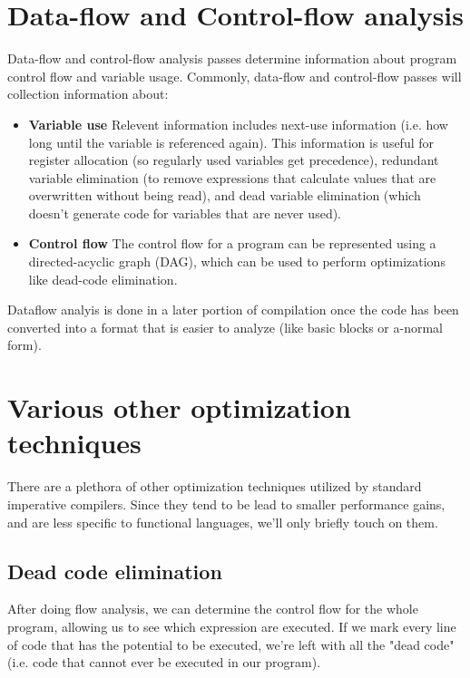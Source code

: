 \documentclass{book}
\newlength{\stabLeft}
\newcommand{\atItemizeStart}[0]{\addtolength{\stabLeft}{\labelsep}
                                \addtolength{\stabLeft}{\labelwidth}}
\let\SOriginalthesubsubsection\thesubsubsection
\newcommand{\Ssubsection}[2]{\subsection[#1]{#2}\let\thesubsubsection\SOriginalthesubsubsection}
\newcommand{\Ssubsubsection}[2]{\subsubsection[#1]{#2}}
\renewcommand{\Ssubsection}[2]{\section[#1]{#2}}
\renewcommand{\Ssubsubsection}[2]{\subsection[#1]{#2}}
\begin{document}
\Ssubsection{Data{-}flow and Control{-}flow analysis}{Data{-}flow and Control{-}flow analysis}\label{t:x28part_x22Datax2dflowx5fandx5fControlx2dflowx5fanalysisx22x29}

Data{-}flow and control{-}flow analysis passes determine information about
program control flow and variable usage. Commonly, data{-}flow and
control{-}flow passes will collection information about:

\begin{itemize}\atItemizeStart

\item \textbf{Variable use} Relevent information includes next{-}use
information (i.e. how long until the variable is referenced again). This
information is useful for register allocation (so regularly used variables
get precedence), redundant variable elimination (to remove expressions
that calculate values that are overwritten without being read), and dead
variable elimination (which doesn{'}t generate code for variables that are
never used).

\item \textbf{Control flow} The control flow for a program can be represented using a
directed{-}acyclic graph (DAG), which can be used to perform optimizations like dead{-}code elimination.\end{itemize}

Dataflow analyis is done in a later portion of compilation once the code
has been converted into a format that is easier to analyze (like basic
blocks or a{-}normal form).

\Ssubsection{Various other optimization techniques}{Various other optimization techniques}\label{t:x28part_x22Variousx5fotherx5foptimizationx5ftechniquesx22x29}

There are a plethora of other optimization techniques utilized by standard
imperative compilers. Since they tend to be lead to smaller performance
gains, and are less specific to functional languages, we{'}ll only briefly
touch on them.

\Ssubsubsection{Dead code elimination}{Dead code elimination}\label{t:x28part_x22Deadx5fcodex5feliminationx22x29}

After doing flow analysis, we can determine the control flow for the whole program,
allowing us to see which expression are executed. If we mark every line of code that
has the potential to be executed, we{'}re left with all the "dead code" (i.e. code that
cannot ever be executed in our program).
\end{document}
